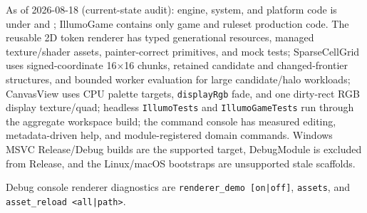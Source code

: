 \begin{statusbox}
As of 2026-08-18 (current-state audit): engine, system, and platform code is
under  and ; IllumoGame contains
only game and ruleset production code. The reusable 2D token renderer has
typed generational resources, managed texture/shader assets, painter-correct
primitives, and mock tests;
SparseCellGrid uses signed-coordinate 16$\times$16 chunks, retained candidate
and changed-frontier structures, and bounded worker evaluation for large
candidate/halo workloads; CanvasView uses CPU palette targets, \texttt{displayRgb}
fade, and one dirty-rect RGB display texture/quad; headless
\texttt{IllumoTests} and \texttt{IllumoGameTests} run through the aggregate
workspace build; the command console has measured editing,
metadata-driven help, and module-registered domain commands. Windows MSVC
Release/Debug builds are the supported target, DebugModule is excluded from
Release, and the Linux/macOS bootstraps are unsupported stale scaffolds.
\end{statusbox}

Debug console renderer diagnostics are \texttt{renderer\_demo [on|off]},
\texttt{assets}, and \texttt{asset\_reload <all|path>}.
